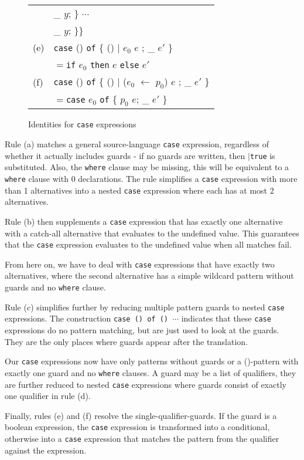 \begin{figure}[hbt]
{\begin{tabular}{ll}
&\hspace{7.0cm}\_ \arrow{} $y$; \} $\cdots$ \\
&\hspace{2.0cm}\_ \arrow{} $y$; \}\}\\
(e) &\texttt{case} () \texttt{of} \{ () $|$ $e_0$ \arrow{} $e$  ; \_ \arrow{} $e'$ \}\\
&$=$\texttt{if} $e_0$ \texttt{then} $e$ \texttt{else} $e'$\\
(f) &\texttt{case} () \texttt{of} \{ () $|$ ($e_0$ $\leftarrow$ $p_0$) \arrow{} $e$  ; \_ \arrow{} $e'$ \}\\
&$=$\texttt{case} $e_0$ \texttt{of} \{ $p_0$ \arrow{} $e$; \_ \arrow{} $e'$ \}\\
\end{tabular}
}
\caption{Identities for \texttt{case} expressions}
\label{formalcase}
\end{figure}

Rule (a) matches a general source-language \texttt{case} expression, regardless of whether it actually includes guards - if no guards are written, then \texttt{$|$true} is substituted. Also, the \texttt{where} clause may be missing, this will be equivalent to a \texttt{where} clause with 0 declarations. The rule simplifies a \texttt{case} expression with more than 1 alternatives into a nested \texttt{case} expression where each has at most 2 alternatives.

Rule (b) then supplements a \texttt{case} expression that has exactly one alternative with a catch-all alternative that evaluates to the undefined value. This guarantees that the  \texttt{case} expression evaluates to the undefined value when all matches fail.

From here on, we have to deal with \texttt{case} expressions that have exactly two alternatives, where the second alternative has a simple wildcard pattern without guards and no \texttt{where} clause.

Rule (c) simplifies further by reducing multiple pattern guards to nested  \texttt{case} expressions. The construction \texttt{case () of () \arrow{} $\cdots$} indicates that these  \texttt{case} expressions do no pattern matching, but are just used to look at the guards. They are the only places where guards appear after the translation.

Our  \texttt{case} expressions now have only patterns without guards or a ()-pattern with exactly one guard and no \texttt{where} clauses. A guard may be a list of qualifiers, they are further reduced to nested  \texttt{case} expressions where guards consist of exactly one qualifier in rule (d).

Finally, rules (e) and (f) resolve the single-qualifier-guards. If the guard is a boolean expression, the \texttt{case} expression is transformed into a conditional, otherwise into a \texttt{case} expression that matches the pattern from the qualifier against the expression.
